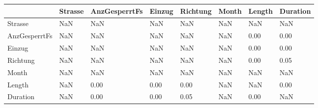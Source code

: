 \begin{tabular}{llllllll}
\toprule
{} & Strasse & AnzGesperrtFs & Einzug & Richtung & Month & Length & Duration \\
\midrule
Strasse       &     NaN &           NaN &    NaN &      NaN &   NaN &    NaN &      NaN \\
AnzGesperrtFs &     NaN &           NaN &    NaN &      NaN &   NaN &   0.00 &     0.00 \\
Einzug        &     NaN &           NaN &    NaN &      NaN &   NaN &   0.00 &     0.00 \\
Richtung      &     NaN &           NaN &    NaN &      NaN &   NaN &   0.00 &     0.05 \\
Month         &     NaN &           NaN &    NaN &      NaN &   NaN &    NaN &      NaN \\
Length        &     NaN &          0.00 &   0.00 &     0.00 &   NaN &    NaN &     0.00 \\
Duration      &     NaN &          0.00 &   0.00 &     0.05 &   NaN &   0.00 &      NaN \\
\bottomrule
\end{tabular}
